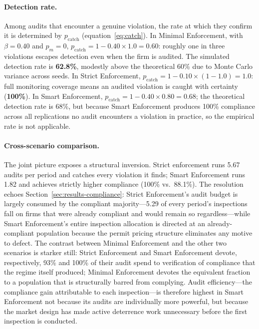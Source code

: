 \paragraph{Detection rate.}

Among audits that encounter a genuine violation, the rate at which they confirm it is determined by $p_{\mathrm{catch}}$ (equation~\ref{eq:catch}). In Minimal Enforcement, with $\beta = 0.40$ and $p_m = 0$, $p_{\mathrm{catch}} = 1 - 0.40 \times 1.0 = 0.60$: roughly one in three violations escapes detection even when the firm is audited. The simulated detection rate is \textbf{62.8\%}, modestly above the theoretical 60\% due to Monte Carlo variance across seeds. In Strict Enforcement, $p_{\mathrm{catch}} = 1 - 0.10 \times (1 - 1.0) = 1.0$: full monitoring coverage means an audited violation is caught with certainty (\textbf{100\%}). In Smart Enforcement, $p_{\mathrm{catch}} = 1 - 0.40 \times 0.80 = 0.68$; the theoretical detection rate is 68\%, but because Smart Enforcement produces 100\% compliance across all replications no audit encounters a violation in practice, so the empirical rate is not applicable.

\paragraph{Cross-scenario comparison.}

The joint picture exposes a structural inversion. Strict  enforcement runs 5.67 audits per period and catches every violation it finds; Smart Enforcement runs 1.82 and achieves strictly higher compliance (100\% vs.\ 88.1\%). The resolution echoes Section~\ref{sec:results-compliance}: Strict Enforcement's audit budget is
largely consumed by the compliant majority---5.29 of every period's
inspections fall on firms that were already compliant and would remain so
regardless---while Smart Enforcement's entire inspection allocation is directed at an
already-compliant population because the permit pricing structure eliminates
any motive to defect. The contrast between Minimal Enforcement and the other two
scenarios is starker still: Strict Enforcement and Smart Enforcement devote, respectively, 93\%
and 100\% of their audit spend to verification of compliance that the regime
itself produced; Minimal Enforcement devotes the equivalent fraction to a population
that is structurally barred from complying. Audit efficiency---the
compliance gain attributable to each inspection---is therefore highest in
Smart Enforcement not because its audits are individually more powerful, but because
the market design has made active deterrence work unnecessary before the
first inspection is conducted.

